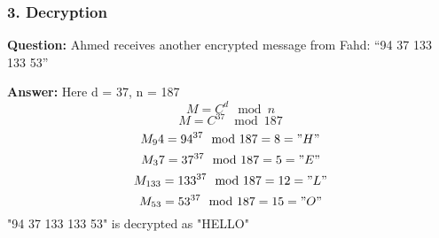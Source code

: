 \documentclass[a4paper]{article}
\begin{document}
\begin{itemize}
          \subsubsection*{3. Decryption}
          \textbf{Question: }Ahmed receives another encrypted message from Fahd: “94 37 133 133 53” \newline

          \textbf{Answer: }
          Here d = 37, n = 187
          \[ M = C^d \mod n \]
          \[ M = C^{37} \mod 187 \]
          \[ M_94 = 94^{37}\mod 187 = 8 = "H" \]
          \[ M_37 = 37^{37}\mod 187 = 5 = "E" \]
          \[ M_{133} = 133^{37}\mod 187 = 12 = "L" \]
          \[ M_{53} = 53^{37}\mod 187 = 15 = "O" \]
          "94 37 133 133 53" is decrypted as "HELLO"
\end{itemize}
\end{document}

